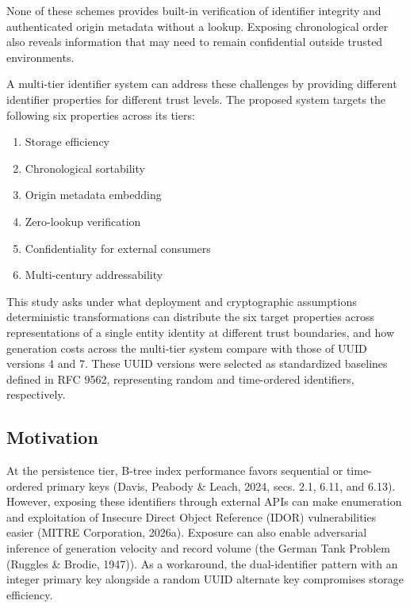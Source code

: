 \documentclass[fleqn,10pt]{wlpeerj}
\providecommand{\tightlist}{%
  \setlength{\itemsep}{0pt}\setlength{\parskip}{0pt}}
\begin{document}
None of these schemes provides built-in verification of identifier
integrity and authenticated origin metadata without a lookup. Exposing
chronological order also reveals information that may need to remain
confidential outside trusted environments.

A multi-tier identifier system can address these challenges by providing
different identifier properties for different trust levels. The proposed
system targets the following six properties across its tiers:

\begin{enumerate}
\def\labelenumi{\arabic{enumi}.}
\tightlist
\item
  Storage efficiency
\item
  Chronological sortability
\item
  Origin metadata embedding
\item
  Zero-lookup verification
\item
  Confidentiality for external consumers
\item
  Multi-century addressability
\end{enumerate}

This study asks under what deployment and cryptographic assumptions
deterministic transformations can distribute the six target properties
across representations of a single entity identity at different trust
boundaries, and how generation costs across the multi-tier system
compare with those of UUID versions 4 and 7. These UUID versions were
selected as standardized baselines defined in RFC 9562, representing
random and time-ordered identifiers, respectively.

\subsection{Motivation}\label{motivation}

At the persistence tier, B-tree index performance favors sequential or
time-ordered primary keys (Davis, Peabody \& Leach, 2024, secs. 2.1,
6.11, and 6.13). However, exposing these identifiers through external
APIs can make enumeration and exploitation of Insecure Direct Object
Reference (IDOR) vulnerabilities easier (MITRE Corporation, 2026a).
Exposure can also enable adversarial inference of generation velocity
and record volume (the German Tank Problem (Ruggles \& Brodie, 1947)).
As a workaround, the dual-identifier pattern with an integer primary key
alongside a random UUID alternate key compromises storage efficiency.
\end{document}
